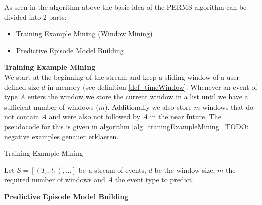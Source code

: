 As seen in the algorithm above the basic idea of the PERMS algorithm can be divided into 2 parts:

\begin{itemize}
	\item Training Example Mining (Window Mining)
	\item Predictive Episode Model Building
\end{itemize}

\textbf{Training Example Mining}\\
We start at the beginning of the stream and keep a sliding window of a user defined size $d$ in memory (see definition \ref{def_timeWindow}. Whenever an event of type $A$ enters the window we store the current window in a list until we have a sufficient number of windows ($m$). Additionally we also store $m$ windows that do not contain $A$ and were also not followed by $A$ in the near future. The pseudocode for this is given in algorithm \ref{alg_traningExampleMining}. TODO: negative examples genauer erklaeren.

\begin{algorithm}[H]
  \caption{Training Example Mining
    \label{alg_traningExampleMining}}
  \begin{algorithmic}[1]
    \Statex
    \Require Let $S=[(T_s,t_1),...]$ be a stream of events, $d$ be the window size, $m$ the required number of windows and $A$ the event type to predict.
          		 
          	\EndIf
       	\EndIf
      \EndWhile
      \State {}
    \EndFunction
  \end{algorithmic}
\end{algorithm}

\textbf{Predictive Episode Model Building}\\


